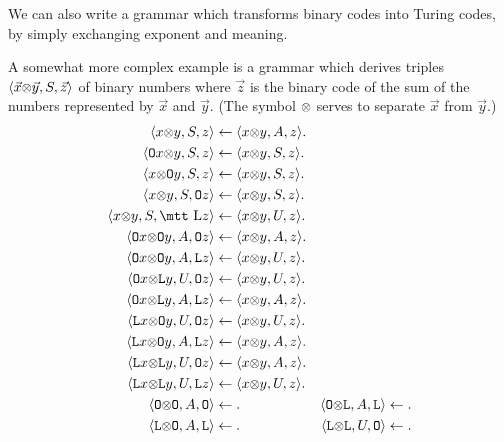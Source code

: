 We can also write a grammar which transforms binary codes into
Turing codes, by simply exchanging exponent and meaning. 

A somewhat more complex example is a grammar which derives
triples $\langle \vec{x}\mbox{\small$\otimes$} \vec{y}, S, \vec{z}\rangle$ of binary 
numbers where $\vec{z}$ is the binary code of the sum of 
the numbers represented by $\vec{x}$ and $\vec{y}$. (The symbol 
$\sotimes$ 
\index{$\sotimes$}%
serves to separate $\vec{x}$ from $\vec{y}$.)
\begin{subequations}
\begin{align}
\auf x\sotimes y, S, z \zu & \hrn \auf x\sotimes y, A, z\zu. \\\notag
\auf \mbox{\tt O}x\sotimes y, S, z\zu & \hrn \auf x\sotimes y, S, z\zu.
	\\\notag
\auf x\sotimes \mbox{\tt O}y, S, z\zu & \hrn \auf x\sotimes y, S, z\zu.
	 \\\notag
\auf x\sotimes y, S, \mbox{\tt O}z\zu & \hrn \auf x\sotimes y, S, z\zu.
	 \\\notag
\auf x\sotimes y, S, \mbox{\mtt L}z\zu & \hrn \auf x\sotimes y, U, z\zu. 
	\\
\auf \mbox{\tt O}x\sotimes \mbox{\tt O}y, A, \mbox{\tt O}z\zu
    & \hrn \auf x\sotimes y, A, z\zu. \\\notag
\auf \mbox{\tt O}x\sotimes \mbox{\tt O}y, A, \mbox{\tt L}z\zu
    & \hrn \auf x\sotimes y, U, z\zu. \\\notag
\auf \mbox{\tt O}x\sotimes \mbox{\tt L}y, U, \mbox{\tt O}z\zu
    & \hrn \auf x\sotimes y, U, z\zu. \\\notag
\auf \mbox{\tt O}x\sotimes \mbox{\tt L}y, A, \mbox{\tt L}z\zu
    & \hrn \auf x\sotimes y, A, z\zu. \\\notag
\auf \mbox{\tt L}x\sotimes \mbox{\tt O}y, U, \mbox{\tt O}z\zu
    & \hrn \auf x\sotimes y, U, z\zu. \\\notag
\auf \mbox{\tt L}x\sotimes \mbox{\tt O}y, A, \mbox{\tt L}z\zu
    & \hrn \auf x\sotimes y, A, z\zu. \\\notag
\auf \mbox{\tt L}x\sotimes \mbox{\tt L}y, U, \mbox{\tt O}z\zu
    & \hrn \auf x\sotimes y, A, z\zu. \\\notag
\auf \mbox{\tt L}x\sotimes \mbox{\tt L}y, U, \mbox{\tt L}z\zu
    & \hrn \auf x\sotimes y, U, z\zu. \\
\auf \mbox{\tt O}\sotimes \mbox{\tt O}, A, \mbox{\tt O}\zu & \hrn . 
    & 
\auf \mbox{\tt O}\sotimes \mbox{\tt L}, A, \mbox{\tt L}\zu \hrn . \\\notag
\auf \mbox{\tt L}\sotimes \mbox{\tt O}, A, \mbox{\tt L}\zu & \hrn .
    &
\auf \mbox{\tt L}\sotimes \mbox{\tt L}, U, \mbox{\tt O}\zu \hrn .
\end{align}
\end{subequations}
